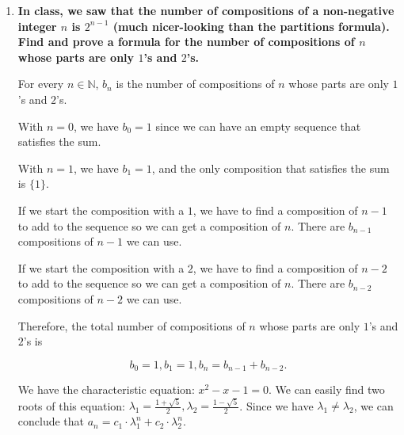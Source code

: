 \documentclass[10pt]{article}
\begin{document}
\begin{enumerate}
\begin{enumerate}
The number of partitions of $n$ with the parts equal to $1$ or $2$ is the coefficient of $x^n$ in the generating function above, or $a_n = \frac{1}{2}(n+1)+\frac{1}{4}+\frac{(-1)^n}{4}$.

We consider the parity of $n$:
\begin{itemize}
    \item \textbf{Case 1:} $n \equiv 0 \pmod 2$, so we can write $n = 2k, k \in \mathbb{N}$
    
    We have $a_n = \frac{1}{2}(n+1)+\frac{1}{4}+\frac{1}{4} = \frac{n}{2} + 1 = k+1$.

    \item \textbf{Case 2:} $n \equiv 1 \pmod 2$,  so we can write $n = 2k+1, k \in \mathbb{N}$
    
    We have $a_n = \frac{1}{2}(n+1)+\frac{1}{4}-\frac{1}{4} = \frac{n+1}{2}=\frac{2k+2}{2} = k+1.$
\end{itemize}

\item
\textbf{In class, we saw that the number of compositions of a non-negative integer $n$ is $2^{n-1}$ (much nicer-looking than the partitions formula).  Find and prove a formula for the number of compositions of $n$ whose parts are only $1$'s and $2$'s.}


For every $n \in \mathbb{N}$, $b_n$ is the number of compositions of $n$ whose parts are only $1$'s and $2$'s.

With $n = 0$, we have $b_0 = 1$ since we can have an empty sequence that satisfies the sum.

With $n = 1$, we have $b_1 = 1$, and the only composition that satisfies the sum is $\{1\}$.

If we start the composition with a $1$, we have to find a composition of $n-1$ to add to the sequence so we can get a composition of $n$. There are $b_{n-1}$ compositions of $n-1$ we can use.

If we start the composition with a $2$, we have to find a composition of $n-2$ to add to the sequence so we can get a composition of $n$. There are $b_{n-2}$ compositions of $n-2$ we can use.

Therefore, the total number of compositions of $n$ whose parts are only $1$'s and $2$'s is 

$$b_0=1, b_1=1, b_n = b_{n-1}+b_{n-2}.$$

We have the characteristic equation: $x^2 - x - 1 = 0$. We can easily find two roots of this equation: $\lambda_1 = \frac{1+\sqrt{5}}{2}, \lambda_2 = \frac{1-\sqrt{5}}{2}$. Since we have $\lambda_1 \neq \lambda_2$, we can conclude that $a_n=c_1\cdot \lambda_1^n+c_2\cdot \lambda_2^n$.


\end{enumerate}
\end{enumerate}
\end{document}
